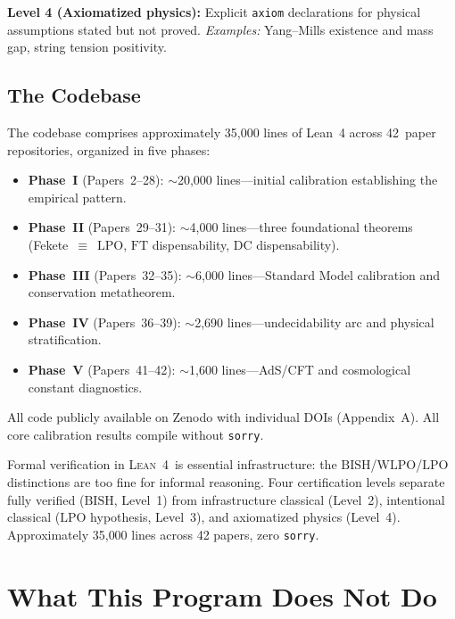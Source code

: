 \documentclass[11pt,a4paper]{report}
\theoremstyle{plain}
\theoremstyle{definition}
\theoremstyle{remark}
\newcommand{\BISH}{\mathrm{BISH}}
\newcommand{\WLPO}{\mathrm{WLPO}}
\newcommand{\LPO}{\mathrm{LPO}}
\newcommand{\FT}{\mathrm{FT}}
\newcommand{\DC}{\mathrm{DC}}
\newcommand{\Lean}{\textsc{Lean~4}}
\begin{document}
\textbf{Level 4 (Axiomatized physics):} Explicit \texttt{axiom} declarations for physical assumptions stated but not proved. \emph{Examples:} Yang--Mills existence and mass gap, string tension positivity.

\section{The Codebase}

The codebase comprises approximately 35{,}000 lines of Lean~4 across 42~paper repositories, organized in five phases:
\begin{itemize}[nosep]
\item \textbf{Phase~I} (Papers~2--28): $\sim$20{,}000 lines---initial calibration establishing the empirical pattern.
\item \textbf{Phase~II} (Papers~29--31): $\sim$4{,}000 lines---three foundational theorems (Fekete~$\equiv$~$\LPO$, $\FT$ dispensability, $\DC$ dispensability).
\item \textbf{Phase~III} (Papers~32--35): $\sim$6{,}000 lines---Standard Model calibration and conservation metatheorem.
\item \textbf{Phase~IV} (Papers~36--39): $\sim$2{,}690 lines---undecidability arc and physical stratification.
\item \textbf{Phase~V} (Papers~41--42): $\sim$1{,}600 lines---AdS/CFT and cosmological constant diagnostics.
\end{itemize}
All code publicly available on Zenodo with individual DOIs (Appendix~A). All core calibration results compile without \texttt{sorry}.

\begin{chapterbox}
Formal verification in \Lean\ is essential infrastructure: the $\BISH$/$\WLPO$/$\LPO$ distinctions are too fine for informal reasoning. Four certification levels separate fully verified ($\BISH$, Level~1) from infrastructure classical (Level~2), intentional classical ($\LPO$ hypothesis, Level~3), and axiomatized physics (Level~4). Approximately 35{,}000 lines across 42 papers, zero \texttt{sorry}.
\end{chapterbox}

\chapter{What This Program Does Not Do}
\end{document}
